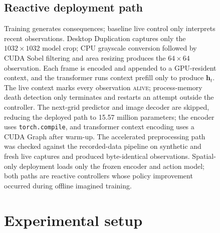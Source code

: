 \begin{figure}[!htbp]
\subsection{Reactive deployment path}
\label{sec:deployment-method}

Training generates consequences; baseline live control only interprets recent observations.
Desktop Duplication captures only the \(1032\times1032\) model crop; CPU grayscale conversion followed by CUDA Sobel filtering and area resizing produces the \(64\times64\) observation.
Each frame is encoded and appended to a GPU-resident context, and the transformer runs context prefill only to produce \(\mathbf h_t\).
The live context marks every observation \textsc{alive}; process-memory death detection only terminates and restarts an attempt outside the controller.
The next-grid predictor and image decoder are skipped, reducing the deployed path to 15.57 million parameters; the encoder uses \texttt{torch.compile}, and transformer context encoding uses a CUDA Graph after warm-up.
The accelerated preprocessing path was checked against the recorded-data pipeline on synthetic and fresh live captures and produced byte-identical observations.
Spatial-only deployment loads only the frozen encoder and action model; both paths are reactive controllers whose policy improvement occurred during offline imagined training.

\FloatBarrier
\section{Experimental setup}
\label{sec:setup}


\end{figure}
